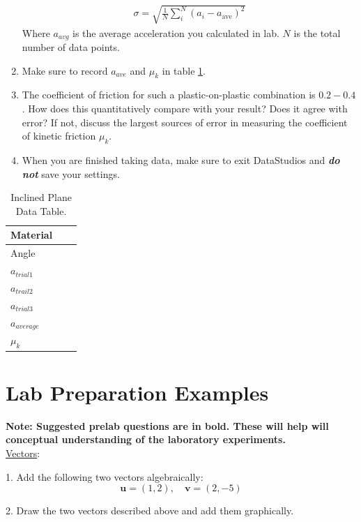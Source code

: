 \begin{enumerate}
\begin{gather}
\sigma = \sqrt{\frac{1}{N}\sum_{i}^{N} (a_i - a_{\text{ave}})^2} 
\end{gather}
Where $a_{avg}$ is the average acceleration you calculated in lab. $N$ is the total number of data points. 
\item  Make sure to record $a_{ave}$ and $\mu_k$ in table \ref{planedatatable}.
     \item The coefficient of friction for such a plastic-on-plastic combination is $0.2-0.4$.  How does this quantitatively compare with your result? Does it agree with error? If not, discuss the largest sources of error in measuring the coefficient of kinetic friction $\mu_k$.
    \item When you are finished taking data, make sure to exit DataStudios and {\bf{\it{do not}}} save your settings.
\end{enumerate}

\begin{table}
\begin{center}
\begin{tabular}{|l |p{5 cm}| p{5 cm} |}
\hline
	Material &  \\
	\hline
	Angle& \\
	\hline
	$a_{trial 1}$& \\
	\hline
	$a_{trail 2}$& \\
	\hline
	$a_{trial 3}$& \\
	\hline
	$a_{average}$& \\
	\hline
	$\mu_k$& \\
	\hline
\end{tabular}
\end{center}
\caption{Inclined Plane Data Table.}
\label{planedatatable}
\end{table}

\section{Lab Preparation Examples}
{\bf{Note: Suggested prelab questions are in bold. These will help will conceptual understanding of the laboratory experiments.}}
\\
\noindent \underline{Vectors}:\myskip

1. Add the following two vectors algebraically:
\begin{equation*}
    \mathbf{u} = (1,2),\quad \mathbf{v} = (2,-5)
\end{equation*}

2. Draw the two vectors described above and add them graphically. \myskip

